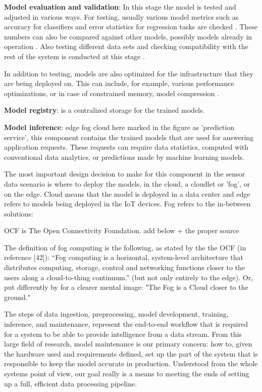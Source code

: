 \textbf{Model evaluation and validation}: In this stage the model is tested and adjusted in various ways. For testing, usually various model metrics such as accuracy for classifiers and error statistics for regression tasks are checked \cite{iotsurvey}. These numbers can also be compared against other models, possibly models already in operation \cite{googlemlops}. Also testing different data sets and checking compatibility with the rest of the system is conducted at this stage \cite{googlemlops}.

In addition to testing, models are also optimized for the infrastructure that they are being deployed on. This can include, for example, various performance optimizations, or in case of constrained memory, model compression \cite{iotsurvey}.

\textbf{Model registry}: is a centralized storage for the trained models. 


\textbf{Model inference}: edge fog cloud here marked in the figure as 'prediction service', this component contains the trained models that are used for answering application requests. These requests can require data statistics, computed with conventional data analytics, or predictions made by machine learning models.

The most important design decision to make for this component in the sensor data scenario is where to deploy the models, in the cloud, a cloudlet or 'fog', or on the edge. Cloud means that the model is deployed in a data center and edge refers to models being deployed in the IoT devices. Fog refers to the in-between solutions: 

OCF is The Open Connectivity Foundation. add below + the proper source

The definition of fog computing is the following, as stated by the the OCF (in \cite{fogsurvey} reference [42]): “Fog computing is a horizontal, system-level architecture that distributes computing, storage, control and networking functions closer to the users along a cloud-to-thing continuum.” (but not only entirely to the edge). Or, put differently by \cite{fogsurvey} for a clearer mental image: "The Fog is a Cloud closer to the ground."

The steps of data ingestion, preprocessing, model development, training, inference, and maintenance, represent the end-to-end workflow that is required for a system to be able to provide intelligence from a data stream. From this large field of research, model maintenance is our primary concern: how to, given the hardware used and requirements defined, set up the part of the system that is responsible to keep the model accurate in production. Understood from the whole systems point of view, our goal really is a means to meeting the ends of setting up a full, efficient data processing pipeline.

